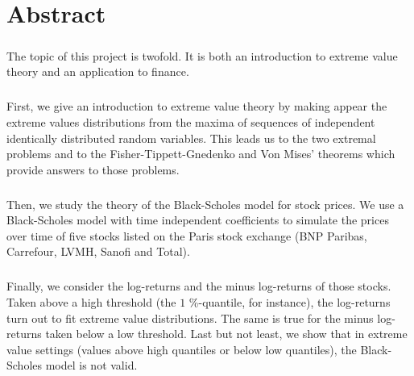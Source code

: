 

\cleardoublepage
\chapter*{Abstract}
\bigskip
\paragraph{}
The topic of this project is twofold. It is both an introduction to extreme value theory and an application to finance.
\paragraph{}
First, we give an introduction to extreme value theory by making appear the extreme values distributions from the maxima of sequences of independent identically distributed random variables. This leads us to the two extremal problems and to the Fisher-Tippett-Gnedenko and Von Mises' theorems which provide answers to those problems.
\paragraph{}
Then, we study the theory of the Black-Scholes model for stock prices. We use a Black-Scholes model with time independent coefficients to simulate the prices over time of five stocks listed on the Paris stock exchange (BNP Paribas, Carrefour, LVMH, Sanofi and Total). 
\paragraph{}
Finally, we consider the log-returns and the minus log-returns of those stocks. Taken above a high threshold (the $1$ \%-quantile, for instance), the log-returns turn out to fit extreme value distributions. The same is true for the minus log-returns taken below a low threshold. Last but not least, we show that in extreme value settings (values above high quantiles or below low quantiles), the Black-Scholes model is not valid.
\vskip0.5cm


